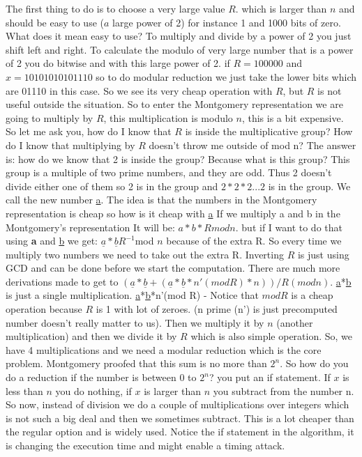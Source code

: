 The first thing to do is to choose a very large value $R$. which is larger than
$n$ and should be easy to use ($a$ large power of 2) for instance 1 and 1000
bits of zero. What does it mean easy to use? To multiply and divide by a power
of 2 you just shift left and right. To calculate the modulo of very large number
that is a power of 2 you do bitwise and with this large power of 2. if
$R=100000$ and $x = 10101010101110$ so to do  modular reduction we just take the
lower bits which are 01110 in this case. So we see its very cheap operation with
$R$, but $R$ is not useful outside the situation. So to enter the Montgomery
representation we are going to multiply by $R$, this multiplication is modulo
$n$, this is a bit expensive. So let me ask you, how do I know that $R$ is
inside the multiplicative group? How do I know that multiplying by $R$ doesn't
throw me outside of mod n? The answer is: how do we know that 2 is inside the
group? Because what is this group? This group is a multiple of two prime
numbers, and they are odd. Thus 2 doesn't divide either one of them so 2 is in
the group and \(2*2*2...2\) is in the group. We call the new number
\underline{a}. The idea is that the numbers in the Montgomery representation is
cheap so how is it cheap with \underline{a} If we multiply a and b in the
Montgomery's representation It will be: \(a*b*R mod n\). but if I want to do
that using \textbf{a} and \underline{b} we  get:
\(\underline{a}*\underline{b}R^{-1}\)mod $n$ because of the extra R. So every
time we multiply two numbers we need to take out the extra R. Inverting $R$ is
just using GCD and can be done before we start the computation. There are much
more derivations made to get to  \((\underline{a}*\underline{b} +
(\underline{a}*\underline{b}*n'(mod R)*n))/R(modn) \).
\underline{a}*\underline{b} is just a single multiplication.
\underline{a}*\underline{b}*n'(mod R) - Notice that \(modR\) is a cheap
operation because $R$ is 1 with lot of zeroes. (n prime (n') is just precomputed
number doesn't really matter to us). Then we multiply it by $n$ (another
multiplication) and then we divide it by $R$ which is also simple operation. So,
we have 4 multiplications and we need a modular reduction which is the core
problem. Montgomery proofed that this sum is no more than \(2^n\). So how do you
do a reduction if the number is between 0 to \(2^n\)? you put an if statement.
If $x$ is less than $n$ you do nothing, if $x$ is larger than $n$ you subtract
from the number n. So now, instead of division we do a couple of multiplications
over integers which is not such a big deal and then we sometimes subtract. This
is a lot cheaper than the regular option and is widely used. Notice the if
statement in the algorithm, it is changing the execution time and might enable a
timing attack.

